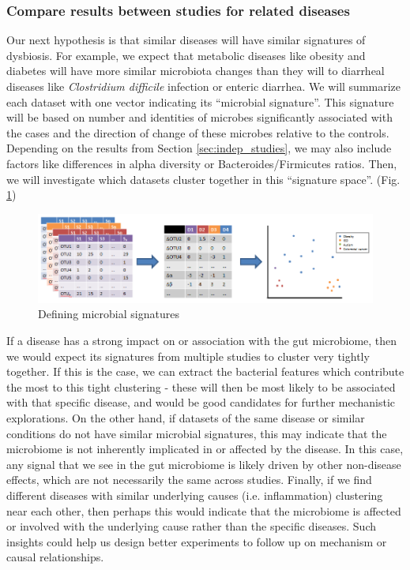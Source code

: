 \documentclass[12pt]{article}
\begin{document}
\subsubsection{Compare results between studies for related diseases}\label{sec:signatures}
Our next hypothesis is that similar diseases will have similar 
signatures of dysbiosis. For example, we expect that metabolic 
diseases like obesity and diabetes will have more similar microbiota 
changes than they will to diarrheal diseases like \textit{Clostridium 
difficile} infection or enteric diarrhea. We will summarize each 
dataset with one vector indicating its ``microbial signature''. This 
signature will be based on number and identities of microbes 
significantly associated with the cases and the direction of change 
of these microbes relative to the controls. Depending on the results from Section 
\ref{sec:indep_studies}, we may also include factors like differences 
in alpha diversity or Bacteroides/Firmicutes ratios. Then, we will 
investigate which datasets cluster together in this ``signature space''. 
(Fig. \ref{fig:microbe_signatures})

\begin{figure}
\begin{center}
\includegraphics[scale=0.5]{microbial_signatures}
\caption{Defining microbial signatures}\label{fig:microbe_signatures}
\end{center}
\end{figure}

If a disease has a strong impact on or association with the gut 
microbiome, then we would expect its signatures from multiple studies 
to cluster very tightly together. If this is the case, we can extract 
the bacterial features which contribute the most to this tight 
clustering - these will then be most likely to be associated with that 
specific disease, and would be good candidates for further mechanistic 
explorations. On the other hand, if datasets of the same disease or 
similar conditions do not have similar microbial signatures, this may 
indicate that the microbiome is not inherently implicated in or affected 
by the disease. In this case, any signal that we see in the gut 
microbiome is likely driven by other non-disease effects, which are 
not necessarily the same across studies. Finally, if we find different 
diseases with similar underlying causes (i.e. inflammation) clustering 
near each other, then perhaps this would indicate that the microbiome 
is affected or involved with the underlying cause rather than the 
specific diseases. Such insights could help us design better 
experiments to follow up on mechanism or causal relationships.
\end{document}
